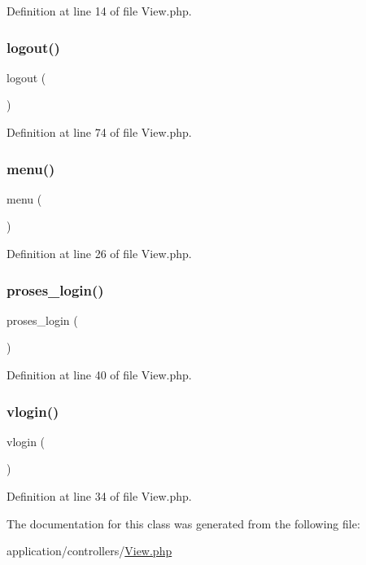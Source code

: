 Definition at line 14 of file View.\+php.

\mbox{\label{class_view_a082405d89acd6835c3a7c7a08a7adbab}} 
\subsubsection{\texorpdfstring{logout()}{logout()}}
{\footnotesize\ttfamily logout (\begin{DoxyParamCaption}{ }\end{DoxyParamCaption})}



Definition at line 74 of file View.\+php.

\mbox{\label{class_view_a0b186fb0489b5ca85dd5da0b195aa9c9}} 
\subsubsection{\texorpdfstring{menu()}{menu()}}
{\footnotesize\ttfamily menu (\begin{DoxyParamCaption}{ }\end{DoxyParamCaption})}



Definition at line 26 of file View.\+php.

\mbox{\label{class_view_abf863f5ed9a81d1c9296de687c05fec0}} 
\subsubsection{\texorpdfstring{proses\_login()}{proses\_login()}}
{\footnotesize\ttfamily proses\+\_\+login (\begin{DoxyParamCaption}{ }\end{DoxyParamCaption})}



Definition at line 40 of file View.\+php.

\mbox{\label{class_view_a98ecf53d97093f0f50b149bd0a8b6f9e}} 
\subsubsection{\texorpdfstring{vlogin()}{vlogin()}}
{\footnotesize\ttfamily vlogin (\begin{DoxyParamCaption}{ }\end{DoxyParamCaption})}



Definition at line 34 of file View.\+php.



The documentation for this class was generated from the following file\+:\begin{DoxyCompactItemize}
\item 
application/controllers/\mbox{\hyperlink{_view_8php}{View.\+php}}\end{DoxyCompactItemize}

